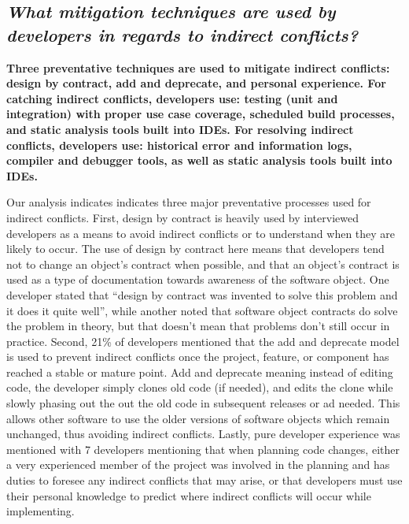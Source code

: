 \documentclass[conference]{IEEEtran}
\begin{document}
{}
\subsection*{ \it{What mitigation techniques are used by developers in regards to indirect conflicts?}}

\bf{Three preventative techniques are used to mitigate indirect conflicts: design by contract, add and deprecate, and personal
experience. For catching indirect conflicts, developers use: testing (unit and integration) with proper use case coverage,
scheduled build processes, and static analysis tools built into IDEs. For resolving indirect conflicts, developers use: historical
error and information logs, compiler and debugger tools, as well as static analysis tools built into IDEs.}

\normalfont{}

Our analysis indicates indicates three major preventative processes used for indirect conflicts.
First, design by contract is heavily used by interviewed developers as a means to avoid indirect conflicts or to understand
when they are likely to occur. The use of design by contract here means that developers tend not to change an object's
contract when possible, and that an object's contract is used as a type of documentation towards awareness of the
software object. One developer stated that ``design by contract was invented to solve this problem and it does it
quite well'', while another noted that software object contracts do solve the problem in theory, but that doesn't
mean that problems don't still occur in practice.
Second, 21\% of developers mentioned that the add and deprecate
model is used to prevent indirect conflicts once
the project, feature, or component has reached a stable or mature point.
Add and deprecate meaning instead of editing code, the developer simply clones old code (if needed), and edits the clone
while slowly phasing out the out the old code in subsequent releases or ad needed. This allows other software to
use the older versions of software objects which remain unchanged, thus avoiding indirect conflicts.
Lastly, pure developer experience was mentioned with 7 developers mentioning that when planning code changes,
either a very experienced member of the project was involved in the planning and has duties to foresee any
indirect conflicts that may arise, or that developers must use their personal knowledge to predict where indirect
conflicts will occur while implementing.
\end{document}
